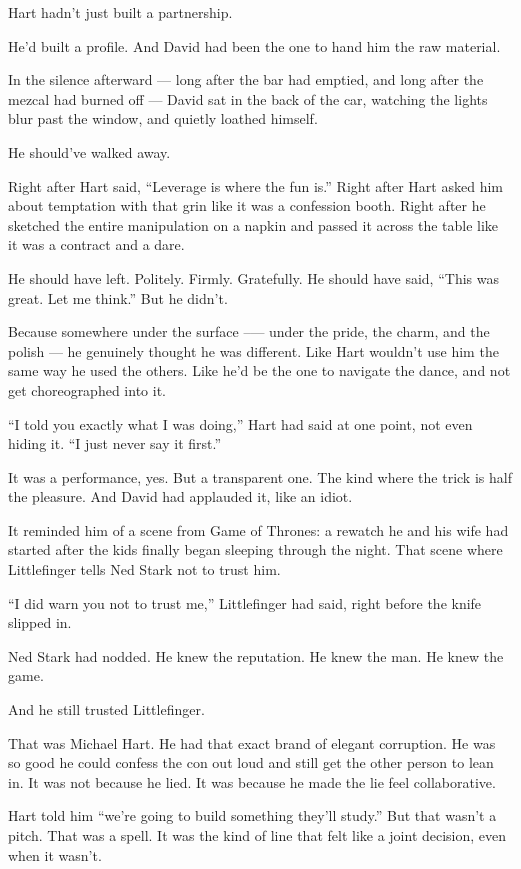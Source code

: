 Hart hadn’t just built a partnership.

He’d built a profile.
And David had been the one to hand him the raw material.

In the silence afterward --- long after the bar had emptied, and long after the mezcal had burned off --- David 
sat in the back of the car, watching the lights blur past the window, and quietly loathed himself.

He should’ve walked away.

Right after Hart said, ``Leverage is where the fun is.''
Right after Hart asked him about temptation with that grin like it was a confession booth.
Right after he sketched the entire manipulation on a napkin and passed it across the table like it was 
a contract and a dare.

He should have left. Politely. Firmly. Gratefully.
He should have said, ``This was great. Let me think.''
But he didn’t.

Because somewhere under the surface --— under the pride, the charm, and the polish --- he genuinely thought 
he was different.
Like Hart wouldn’t use him the same way he used the others.
Like he’d be the one to navigate the dance, and not get choreographed into it.

``I told you exactly what I was doing,'' Hart had said at one point, not even hiding it.
``I just never say it first.''

It was a performance, yes. But a transparent one. The kind where the trick is half the pleasure.
And David had applauded it, like an idiot.

It reminded him of a scene from Game of Thrones: a rewatch he and his wife had started after the kids 
finally began sleeping through the night.
That scene where Littlefinger tells Ned Stark not to trust him.

``I did warn you not to trust me,'' Littlefinger had said, right before the knife slipped in.

Ned Stark had nodded. He knew the reputation. He knew the man. He knew the game.

And he still trusted Littlefinger.

That was Michael Hart. He had that exact brand of elegant corruption.
He was so good he could confess the con out loud and still get the other person to lean in.
It was not because he lied. It was because he made the lie feel collaborative.

Hart told him ``we’re going to build something they’ll study.''
But that wasn’t a pitch. That was a spell.
It was the kind of line that felt like a joint decision, even when it wasn’t.

